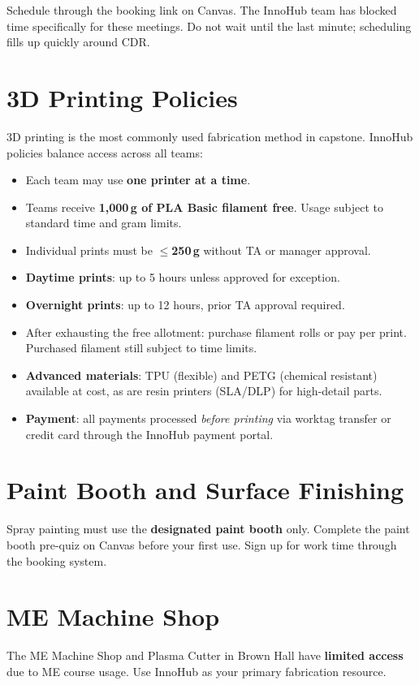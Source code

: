 Schedule through the booking link on Canvas. The InnoHub team has blocked time specifically for these meetings. Do not wait until the last minute; scheduling fills up quickly around CDR.

\section{3D Printing Policies}
3D printing is the most commonly used fabrication method in capstone. InnoHub policies balance access across all teams:
\begin{itemize}[nosep,leftmargin=1.5em]
\item Each team may use \textbf{one printer at a time}.
\item Teams receive \textbf{1,000\,g of PLA Basic filament free}. Usage subject to standard time and gram limits.
\item Individual prints must be $\leq$\textbf{250\,g} without TA or manager approval.
\item \textbf{Daytime prints}: up to 5 hours unless approved for exception.
\item \textbf{Overnight prints}: up to 12 hours, prior TA approval required.
\item After exhausting the free allotment: purchase filament rolls or pay per print. Purchased filament still subject to time limits.
\item \textbf{Advanced materials}: TPU (flexible) and PETG (chemical resistant) available at cost, as are resin printers (SLA/DLP) for high-detail parts.
\item \textbf{Payment}: all payments processed \emph{before printing} via worktag transfer or credit card through the InnoHub payment portal.
\end{itemize}

\section{Paint Booth and Surface Finishing}
Spray painting must use the \textbf{designated paint booth} only. Complete the paint booth pre-quiz on Canvas before your first use. Sign up for work time through the booking system.

\section{ME Machine Shop}
The ME Machine Shop and Plasma Cutter in Brown Hall have \textbf{limited access} due to ME course usage. Use InnoHub as your primary fabrication resource.

